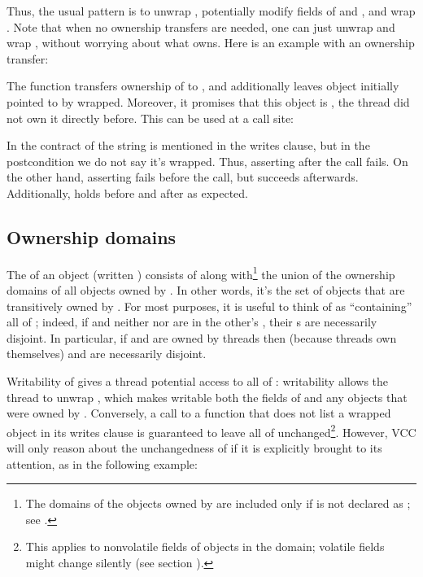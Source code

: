 Thus, the usual pattern is to unwrap , potentially modify
fields of  and , and wrap .
Note that when no ownership transfers are needed, one can just unwrap
and wrap , without worrying about what  owns.
Here is an example with an ownership transfer:


\noindent
The  function transfers ownership of  to ,
and additionally leaves object initially pointed to by 
wrapped. Moreover, it promises that this object is , \ie
the thread did not own it directly before.  This can be used at a call
site:


\noindent
In the contract of  the string  is mentioned
in the writes clause, but in the postcondition we do not say it's wrapped.
Thus, asserting  after the call fails.
On the other hand, asserting  fails before the call,
but succeeds afterwards.
Additionally,  holds before and after as expected.

\subsection{Ownership domains}

The  of an object  (written
) consists of  along with\footnote{ The domains
  of the objects owned by  are included only if  is not
  declared as ; see .} the
union of the ownership domains of all objects owned by .  In
other words, it's the set of objects that are transitively owned by
. For most purposes, it is useful to think of  as
``containing'' all of ; indeed, if  and
neither  nor  are in the other's \vcc{\domain}, their
\vcc{\domain}s are necessarily disjoint. In particular, if 
and  are owned by threads then (because threads own
themselves)  and  are necessarily disjoint.

Writability of  gives a thread potential access to all of
: writability allows the thread to unwrap ,
which makes writable both the fields of  and any objects that were
owned by . Conversely, a call to a function that does not list
a wrapped object  in its writes clause is guaranteed to leave 
all of  unchanged\footnote{
  This applies to nonvolatile fields of objects in
  the domain; volatile fields might change silently (see section ).
}. However, VCC will only reason about the unchangedness of
 if it is explicitly brought to its attention, as in
the following example:

